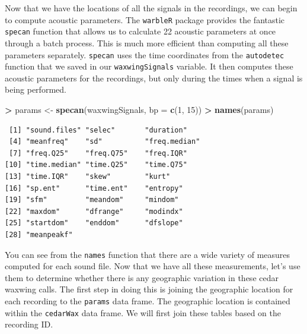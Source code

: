 \documentclass[]{krantz}
\makeatletter
\newenvironment{Shaded}{\begin{snugshade}}{\end{snugshade}}
\newcommand{\KeywordTok}[1]{\textcolor[rgb]{0.27,0.27,0.27}{\textbf{#1}}}
\newcommand{\DataTypeTok}[1]{\textcolor[rgb]{0.27,0.27,0.27}{#1}}
\newcommand{\DecValTok}[1]{\textcolor[rgb]{0.06,0.06,0.06}{#1}}
\newcommand{\CharTok}[1]{\textcolor[rgb]{0.5,0.5,0.5}{#1}}
\newcommand{\StringTok}[1]{\textcolor[rgb]{0.5,0.5,0.5}{#1}}
\newcommand{\OperatorTok}[1]{\textcolor[rgb]{0.43,0.43,0.43}{\textbf{#1}}}
\newcommand{\NormalTok}[1]{#1}
\newenvironment{kframe}{%
\medskip{}
\setlength{\fboxsep}{.8em}
 \def\at@end@of@kframe{}%
 \ifinner\ifhmode%
  \def\at@end@of@kframe{\end{minipage}}%
  \begin{minipage}{\columnwidth}%
 \fi\fi%
 \def\FrameCommand##1{\hskip\@totalleftmargin \hskip-\fboxsep
 \colorbox{shadecolor}{##1}\hskip-\fboxsep
     \hskip-\linewidth \hskip-\@totalleftmargin \hskip\columnwidth}%
 \MakeFramed {\advance\hsize-\width
   \@totalleftmargin\z@ \linewidth\hsize
   \@setminipage}}%
 {\par\unskip\endMakeFramed%
 \at@end@of@kframe}
\renewenvironment{Shaded}{\begin{kframe}}{\end{kframe}}
\makeatother
\begin{document}
Now that we have the locations of all the signals in the recordings, we
can begin to compute acoustic parameters. The \texttt{warbleR} package
provides the fantastic \texttt{specan} function that allows us to
calculate 22 acoustic parameters at once through a batch process. This
is much more efficient than computing all these parameters separately.
\texttt{specan} uses the time coordinates from the \texttt{autodetec}
function that we saved in our \texttt{waxwingSignals} variable. It then
computes these acoustic parameters for the recordings, but only during
the times when a signal is being performed.

\begin{Shaded}
\begin{Highlighting}[]
\OperatorTok{>}\StringTok{ }\NormalTok{params <-}\StringTok{ }\KeywordTok{specan}\NormalTok{(waxwingSignals, }\DataTypeTok{bp =} \KeywordTok{c}\NormalTok{(}\DecValTok{1}\NormalTok{, }\DecValTok{15}\NormalTok{))}
\OperatorTok{>}\StringTok{ }\KeywordTok{names}\NormalTok{(params)}
\end{Highlighting}
\end{Shaded}

\begin{verbatim}
 [1] "sound.files" "selec"       "duration"   
 [4] "meanfreq"    "sd"          "freq.median"
 [7] "freq.Q25"    "freq.Q75"    "freq.IQR"   
[10] "time.median" "time.Q25"    "time.Q75"   
[13] "time.IQR"    "skew"        "kurt"       
[16] "sp.ent"      "time.ent"    "entropy"    
[19] "sfm"         "meandom"     "mindom"     
[22] "maxdom"      "dfrange"     "modindx"    
[25] "startdom"    "enddom"      "dfslope"    
[28] "meanpeakf"  
\end{verbatim}

You can see from the \texttt{names} function that there are a wide
variety of measures computed for each sound file. Now that we have all
these measurements, let's use them to determine whether there is any
geographic variation in these cedar waxwing calls. The first step in
doing this is joining the geographic location for each recording to the
\texttt{params} data frame. The geographic location is contained within
the \texttt{cedarWax} data frame. We will first join these tables based
on the recording ID.

\begin{Shaded}
\end{Shaded}
\end{document}

